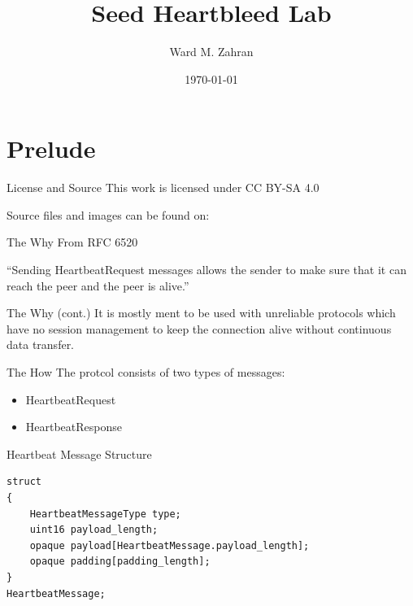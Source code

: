 \documentclass{beamer}
\title{Seed Heartbleed Lab}
\date{\today}
\author{Ward M. Zahran}
\institute{University of Jordan}
\begin{document}
  \maketitle
  \section{Prelude}

  \begin{frame}{License and Source}
  This work is licensed under CC BY-SA 4.0

  Source files and images can be found on:


  \end{frame}

  \begin{frame}{The Why}
    From RFC 6520

    ``Sending HeartbeatRequest messages allows the sender to make sure that it can reach the peer and the peer is alive.''

  \end{frame}

  \begin{frame}{The Why (cont.)}
    It is mostly ment to be used with unreliable protocols which have no session management
    to keep the connection alive without continuous data transfer.
  \end{frame}

  \begin{frame}{The How}
    The protcol consists of two types of messages:
    \begin{itemize}
     \item HeartbeatRequest
     \item HeartbeatResponse
    \end{itemize}
  \end{frame}


  \begin{frame}[fragile]{Heartbeat Message Structure}
    \begin{verbatim}
struct
{
    HeartbeatMessageType type;
    uint16 payload_length;
    opaque payload[HeartbeatMessage.payload_length];
    opaque padding[padding_length];
}
HeartbeatMessage;

    \end{verbatim}


  \end{frame}
\end{document}
